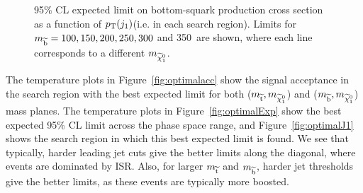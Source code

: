 \begin{figure}[!Hhtb]
\begin{center}
  \caption{95\% CL expected limit on bottom-squark production cross section as a function of $p_{\text{T}}(j_{1})$\GeV (i.e. in each search region). Limits for $m_{\widetilde{{\rm b}}}=100,150,200,250,300$ and 350~\GeV are shown, where each line corresponds to a different $m_{\widetilde{\chi}^{0}_{1}}$.}
  \label{fig:expLimSbot}
  \end{center}
\end{figure}


The temperature plots in Figure~\ref{fig:optimalacc} show the signal acceptance in the search region with the best expected limit for both ($m_{\widetilde{{\rm t}}}, m_{\widetilde{\chi}^{0}_{1}}$) and ($m_{\widetilde{{\rm b}}}, m_{\widetilde{\chi}^{0}_{1}}$) mass planes.
The temperature plots in Figure~\ref{fig:optimalExp} show the best expected 95\% CL limit across the phase space range, and Figure~\ref{fig:optimalJ1} shows the search region in which this best expected limit is found.
We see that typically, harder leading jet cuts give the better limits along the diagonal, where events are dominated by ISR. 
Also, for larger $m_{\widetilde{{\rm t}}}$ and $m_{\widetilde{{\rm b}}}$, harder jet thresholds give the better limits, as these events are typically more boosted.   


